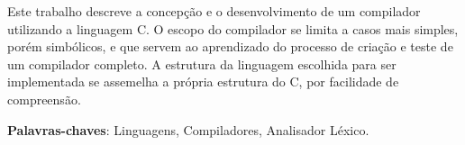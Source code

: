 Este trabalho descreve a concepção e o desenvolvimento de um compilador utilizando a linguagem C. O escopo do compilador se limita a casos mais simples, porém simbólicos, e que servem ao aprendizado do processo de criação e teste de um compilador completo. A estrutura da linguagem escolhida para ser implementada se assemelha a própria estrutura do C, por facilidade de compreensão.

\vspace{\onelineskip}
    
\noindent
\textbf{Palavras-chaves}: Linguagens, Compiladores, Analisador Léxico.
